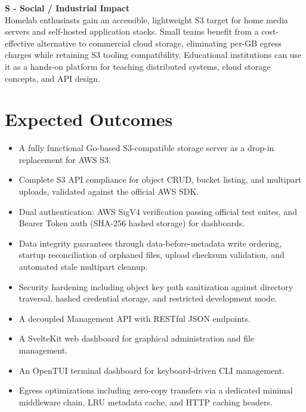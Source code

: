 \documentclass[12pt,a4paper]{report}
\begin{document}
\vspace{0.5cm}
\noindent \textbf{S - Social / Industrial Impact}\\
Homelab enthusiasts gain an accessible, lightweight S3 target for home media servers and self-hosted application stacks. Small teams benefit from a cost-effective alternative to commercial cloud storage, eliminating per-GB egress charges while retaining S3 tooling compatibility. Educational institutions can use it as a hands-on platform for teaching distributed systems, cloud storage concepts, and API design.

\section{Expected Outcomes}
\begin{itemize}
\item A fully functional Go-based S3-compatible storage server as a drop-in replacement for AWS S3.
\item Complete S3 API compliance for object CRUD, bucket listing, and multipart uploads, validated against the official AWS SDK.
\item Dual authentication: AWS SigV4 verification passing official test suites, and Bearer Token auth (SHA-256 hashed storage) for dashboards.
\item Data integrity guarantees through data-before-metadata write ordering, startup reconciliation of orphaned files, upload checksum validation, and automated stale multipart cleanup.
\item Security hardening including object key path sanitization against directory traversal, hashed credential storage, and restricted development mode.
\item A decoupled Management API with RESTful JSON endpoints.
\item A SvelteKit web dashboard for graphical administration and file management.
\item An OpenTUI terminal dashboard for keyboard-driven CLI management.
\item Egress optimizations including zero-copy transfers via a dedicated minimal middleware chain, LRU metadata cache, and HTTP caching headers.
\end{itemize}
\end{document}
